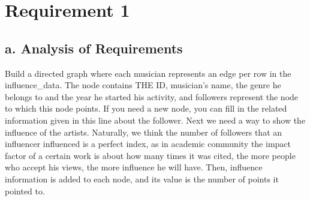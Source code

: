 \documentclass{article}
\begin{document}
\section{Requirement 1}
\subsection{a. Analysis of Requirements}
Build a directed graph where each musician represents an edge per row in the influence\_data. The node contains THE ID, musician's name, the genre he belongs to and the year
he started his activity, and followers represent the node to which this node points.
If you need a new node, you can fill in the related information given in this line about the follower.
Next we need a way to show the influence of the artists. Naturally, we think the number of followers that an influencer influenced is a perfect index, as in academic community
the impact factor of a certain work is about how many times it was cited, the more people who accept his views, the more influence he will have. 
Then, influence information is added to each node, and its value is the number of points it pointed to.
\end{document}
